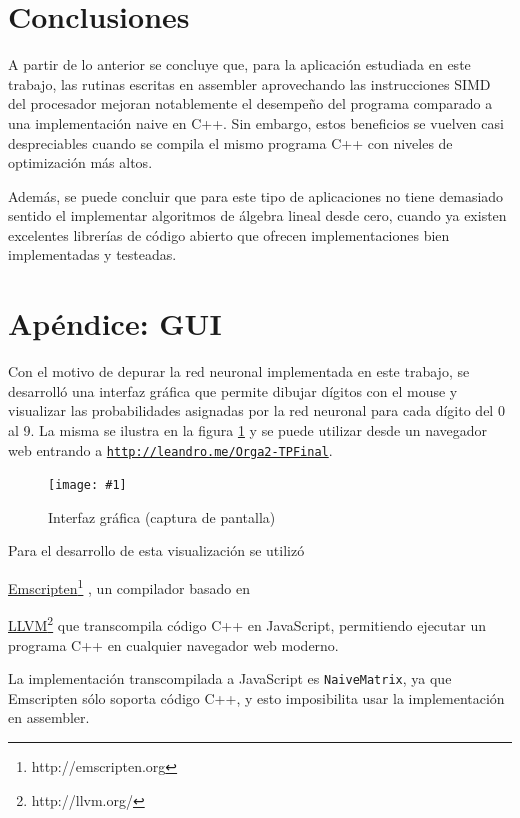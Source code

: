 \documentclass[a4paper, 10pt, twoside]{article}
\newcommand{\img}[3]{
  \begin{figure}[H]
    \begin{center}
      \texttt{[image: \#1]}
    \end{center}
    \caption{#2}
    \label{#3}
  \end{figure}
}
\newcommand{\cc}[1]{\texttt{#1}}
\newcommand{\link}[2]{
  \href{#1}{#2}\footnote{#1}
}
\begin{document}


\section{Conclusiones}

A partir de lo anterior se concluye que, para la aplicación estudiada en este
trabajo, las rutinas escritas en assembler aprovechando las instrucciones SIMD
del procesador mejoran notablemente el desempeño del programa comparado a una
implementación naive en C++. Sin embargo, estos beneficios se vuelven casi
despreciables cuando se compila el mismo programa C++ con niveles de
optimización más altos.

Además, se puede concluir que para este tipo de aplicaciones no tiene demasiado
sentido el implementar algoritmos de álgebra lineal desde cero, cuando ya
existen excelentes librerías de código abierto que ofrecen implementaciones
bien implementadas y testeadas.




\section{Apéndice: GUI}

Con el motivo de depurar la red neuronal implementada en este trabajo, se
desarrolló una interfaz gráfica que permite dibujar dígitos con el mouse y
visualizar las probabilidades asignadas por la red neuronal para cada dígito
del 0 al 9. La misma se ilustra en la figura \ref{img:ui} y se puede utilizar
desde un navegador web entrando a
\texttt{\href{http://leandro.me/Orga2-TPFinal}{http://leandro.me/Orga2-TPFinal}}.

\img{ui.png}{Interfaz gráfica (captura de pantalla)}{img:ui}

Para el desarrollo de esta visualización se utilizó
\link{http://emscripten.org}{Emscripten}, un compilador basado en
\link{http://llvm.org/}{LLVM} que transcompila código C++ en JavaScript,
permitiendo ejecutar un programa C++ en cualquier navegador web moderno.

La implementación transcompilada a JavaScript es \cc{NaiveMatrix}, ya que
Emscripten sólo soporta código C++, y esto imposibilita usar la implementación
en assembler.
\end{document}
